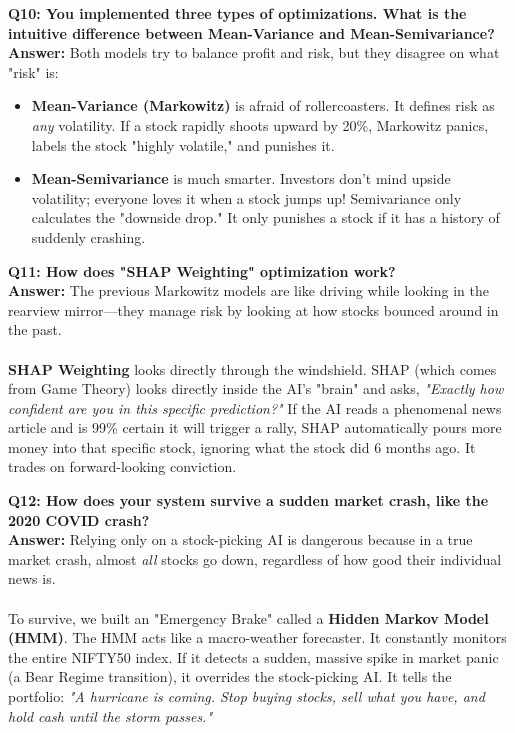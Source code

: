 \documentclass[11pt, a4paper]{article}
\begin{document}
\textbf{\textcolor{IITBlue}{Q10: You implemented three types of optimizations. What is the intuitive difference between Mean-Variance and Mean-Semivariance?}} \\
\textbf{Answer:} Both models try to balance profit and risk, but they disagree on what "risk" is:
\begin{itemize}
    \item \textbf{Mean-Variance (Markowitz)} is afraid of rollercoasters. It defines risk as \textit{any} volatility. If a stock rapidly shoots upward by 20\%, Markowitz panics, labels the stock "highly volatile," and punishes it.
    \item \textbf{Mean-Semivariance} is much smarter. Investors don't mind upside volatility; everyone loves it when a stock jumps up! Semivariance only calculates the "downside drop." It only punishes a stock if it has a history of suddenly crashing.
\end{itemize}

\textbf{\textcolor{IITBlue}{Q11: How does "SHAP Weighting" optimization work?}} \\
\textbf{Answer:} The previous Markowitz models are like driving while looking in the rearview mirror—they manage risk by looking at how stocks bounced around in the past. 
\\ \\
\textbf{SHAP Weighting} looks directly through the windshield. SHAP (which comes from Game Theory) looks directly inside the AI's "brain" and asks, \textit{"Exactly how confident are you in this specific prediction?"} If the AI reads a phenomenal news article and is 99\% certain it will trigger a rally, SHAP automatically pours more money into that specific stock, ignoring what the stock did 6 months ago. It trades on forward-looking conviction.

\textbf{\textcolor{IITBlue}{Q12: How does your system survive a sudden market crash, like the 2020 COVID crash?}} \\
\textbf{Answer:} Relying only on a stock-picking AI is dangerous because in a true market crash, almost \textit{all} stocks go down, regardless of how good their individual news is. 
\\ \\
To survive, we built an "Emergency Brake" called a \textbf{Hidden Markov Model (HMM)}. The HMM acts like a macro-weather forecaster. It constantly monitors the entire NIFTY50 index. If it detects a sudden, massive spike in market panic (a Bear Regime transition), it overrides the stock-picking AI. It tells the portfolio: \textit{"A hurricane is coming. Stop buying stocks, sell what you have, and hold cash until the storm passes."}
\end{document}

